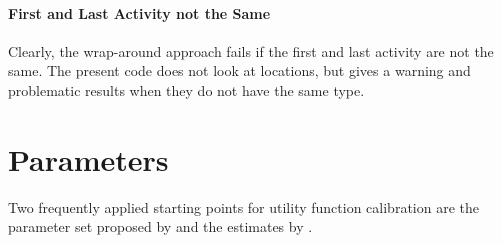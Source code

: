 \paragraph*{First and Last Activity not the Same}

Clearly, the wrap-around approach fails if the first and last activity are not the same.  The present code does not look at locations, but gives a warning and problematic results when they do not have the same type.

\section{Parameters}
Two frequently applied starting points for utility function calibration are the parameter set proposed by \citet[][]{CharyparNagel2005ga4acts} and the estimates by \citet[][]{Kickhoefer_MastersThesis_2009}.

